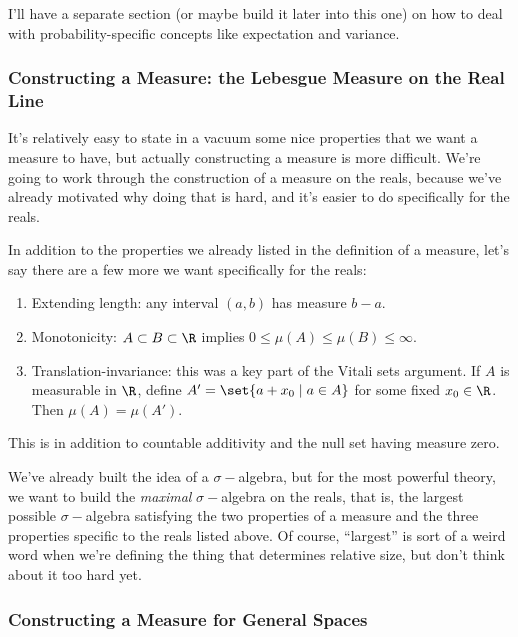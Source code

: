 \documentclass[../analysis.tex]{subfiles}
\begin{document}
    I'll have a separate section (or maybe build it later into this one) on how to deal with probability-specific concepts like expectation and variance.

    \subsubsection{Constructing a Measure: the Lebesgue Measure on the Real Line}

    It's relatively easy to state in a vacuum some nice properties that we want a measure to have, but actually constructing a measure is more difficult. We're going to work through the construction of a measure on the reals, because we've already motivated why doing that is hard, and it's easier to do specifically for the reals.

    In addition to the properties we already listed in the definition of a measure, let's say there are a few more we want specifically for the reals:

    \begin{enumerate}
        \item Extending length: any interval $(a, b)$ has measure $b - a$.
        \item Monotonicity: $A \subset B \subset \R$ implies $0 \leq \mu(A) \leq \mu(B) \leq \infty$.
        \item Translation-invariance: this was a key part of the Vitali sets argument. If $A$ is measurable in $\R$, define $A' = \set{a + x_0 \mid a \in A}$ for some fixed $x_0 \in \R$. Then $\mu(A) = \mu(A')$.
    \end{enumerate}

    This is in addition to countable additivity and the null set having measure zero.

    We've already built the idea of a $\sigma-$algebra, but for the most powerful theory, we want to build the \emph{maximal} $\sigma-$algebra on the reals, that is, the largest possible $\sigma-$algebra satisfying the two properties of a measure and the three properties specific to the reals listed above. Of course, ``largest'' is sort of a weird word when we're defining the thing that determines relative size, but don't think about it too hard yet.

    \subsubsection{Constructing a Measure for General Spaces}
\end{document}
